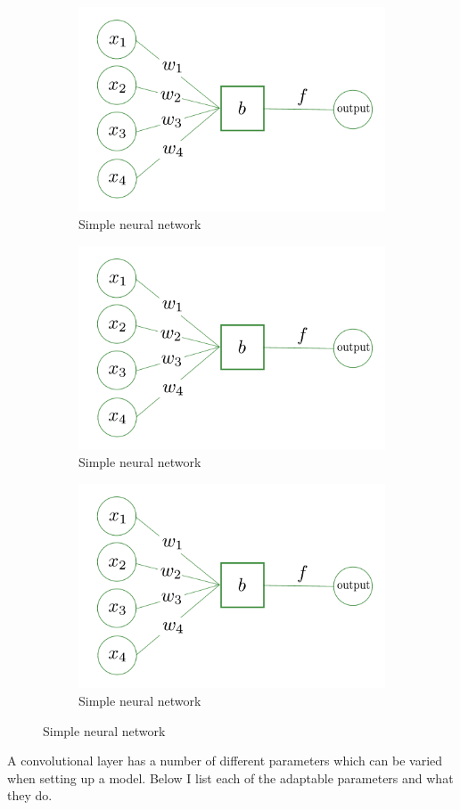 \begin{figure}[h]
\begin{subfigure}[h]{\columnwidth}
    \centering
    \includegraphics[width=0.5\columnwidth]{C4_cnn/neuron.pdf}
    \caption{Simple neural network}
    \label{machine:cnn:convlayer:input}
\end{subfigure}   

\begin{subfigure}[h]{\columnwidth}
    \includegraphics[width=0.5\columnwidth]{C4_cnn/neuron.pdf}
    \caption{Simple neural network}
    \label{machine:cnn:convlayer:nn}
\end{subfigure} 

\begin{subfigure}[h]{\columnwidth}
    \includegraphics[width=0.5\columnwidth]{C4_cnn/neuron.pdf}
    \caption{Simple neural network}
    \label{machine:nn:convlayer:cnn}
\end{subfigure} 

\end{figure}

A convolutional layer has a number of different parameters which can be varied when setting up a model.
Below I list each of the adaptable parameters and what they do.

